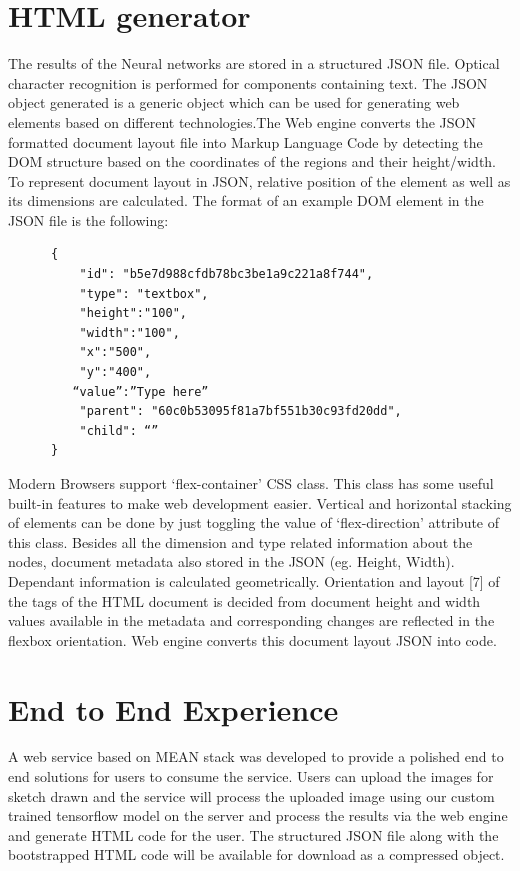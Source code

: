       \section{HTML generator}
      The results of the Neural networks are stored in a structured JSON file. Optical character recognition is performed for components containing text. The JSON object generated is a generic object which can be used for generating web elements based on different technologies.The Web engine converts the JSON formatted document layout file into Markup Language Code by detecting the DOM structure based on the coordinates of the regions and their height/width. To represent document layout in JSON, relative position of the element as well as its dimensions are calculated.
      The format of an example DOM element in the JSON file is the following:
      \begin{verbatim}
      {
          "id": "b5e7d988cfdb78bc3be1a9c221a8f744",
          "type": "textbox",
          "height":"100",
          "width":"100",
          "x":"500",
          "y":"400",
         “value”:”Type here”
          "parent": "60c0b53095f81a7bf551b30c93fd20dd",
          "child": “”
      }
      \end{verbatim}
      Modern Browsers support ‘flex-container’ CSS class. This class has some useful built-in features to make web development easier. Vertical and horizontal stacking of elements can be done by just toggling the value of ‘flex-direction’ attribute of this class.
      Besides all the dimension and type related information about the nodes, document metadata also stored in the JSON (eg. Height, Width). Dependant information is calculated geometrically. Orientation and layout [7] of the tags of the HTML document is decided from document height and width values available in the metadata and corresponding changes are reflected in the flexbox orientation. Web engine converts this document layout JSON into code.

      \section{End to End Experience}
        A web service based on MEAN stack was developed to provide a polished end to end solutions for users to consume the service. Users can upload the images for sketch drawn and the service will process the uploaded image using our custom trained tensorflow model on the server and process the results via the web engine and generate HTML code for the user. The structured JSON file along with the bootstrapped HTML code will be available for download as a compressed object.
